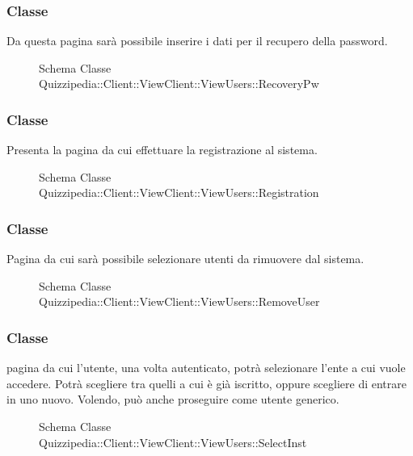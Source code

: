 \subsubsection{Classe }
Da questa pagina sarà possibile inserire i dati per il recupero della password.
\begin{figure}[H]
\centering
\noindent{}
\caption[Schema Classe RecoveryPw]{Schema Classe Quizzipedia::Client::ViewClient::ViewUsers::RecoveryPw}
\end{figure}
\subsubsection{Classe }
Presenta la pagina da cui effettuare la  registrazione al sistema.
\begin{figure}[H]
\centering
\noindent{}
\caption[Schema Classe Registration]{Schema Classe Quizzipedia::Client::ViewClient::ViewUsers::Registration}
\end{figure}
\subsubsection{Classe }
Pagina da cui sarà possibile selezionare utenti da rimuovere dal sistema.
\begin{figure}[H]
\centering
\noindent{}
\caption[Schema Classe RemoveUser]{Schema Classe Quizzipedia::Client::ViewClient::ViewUsers::RemoveUser}
\end{figure}
\subsubsection{Classe }
pagina da cui l'utente, una volta autenticato, potrà selezionare l'ente a cui vuole accedere. Potrà scegliere tra quelli a cui è già iscritto, oppure scegliere di entrare in uno nuovo. Volendo, può anche proseguire come utente generico.
\begin{figure}[H]
\centering
\noindent{}
\caption[Schema Classe SelectInst]{Schema Classe Quizzipedia::Client::ViewClient::ViewUsers::SelectInst}
\end{figure}
